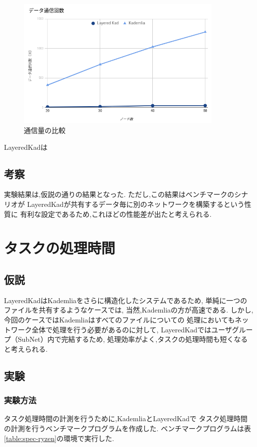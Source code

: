 \documentclass[sotsuron]{jcsie}
\begin{document}
\begin{figure}[H]	
	\centering
	\includegraphics[width=10cm]{./assets/image/traffic_graph.png}
	\caption{通信量の比較}
	\label{figure:traffic-3}
\end{figure}

LayeredKadは

\subsection{考察}
実験結果は,仮説の通りの結果となった.
ただし,この結果はベンチマークのシナリオが
LayeredKadが共有するデータ毎に別のネットワークを構築するという性質に
有利な設定であるため,これほどの性能差が出たと考えられる.

\section{タスクの処理時間}
\subsection{仮説}
LayeredKadはKademliaをさらに構造化したシステムであるため,
単純に一つのファイルを共有するようなケースでは,
当然,Kademliaの方が高速である.
しかし,今回のケースではKademliaはすべてのファイルについての
処理においてもネットワーク全体で処理を行う必要があるのに対して,
LayeredKadではユーザグループ（SubNet）内で完結するため,
処理効率がよく,タスクの処理時間も短くなると考えられる.
\subsection{実験}
\subsubsection{実験方法}
タスク処理時間の計測を行うために,KademliaとLayeredKadで
タスク処理時間の計測を行うベンチマークプログラムを作成した.
ベンチマークプログラムは表\ref{table:spec-ryzen}の環境で実行した.
\end{document}

